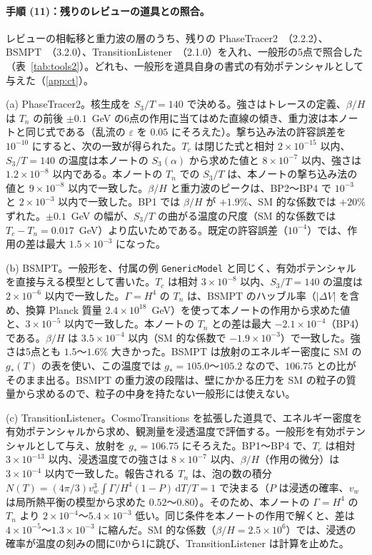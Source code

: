 \documentclass[a4paper,10pt]{ltjsarticle}
\newcommand{\dd}{\mathrm{d}}
\begin{document}
\paragraph{手順 (11)：残りのレビューの道具との照合。}レビューの相転移と重力波の層のうち、残りの PhaseTracer2~\cite{phasetracer2}（2.2.2）、BSMPT~\cite{bsmpt3}（3.2.0）、TransitionListener~\cite{tl2}（2.1.0）を入れ、一般形の5点で照合した（表~\ref{tab:tools2}）。どれも、一般形を道具自身の書式の有効ポテンシャルとして与えた（\ref{app:ct}）。

(a) PhaseTracer2。核生成を $S_3/T=140$ で決める。強さはトレースの定義、$\beta/H$ は $T_n$ の前後 $\pm0.1$~GeV の6点の作用に当てはめた直線の傾き、重力波は本ノートと同じ式である（乱流の $\varepsilon$ を $0.05$ にそろえた）。撃ち込み法の許容誤差を $10^{-10}$ にすると、次の一致が得られた。$T_c$ は閉じた式と相対 $2\times10^{-15}$ 以内、$S_3/T=140$ の温度は本ノートの $S_3(\alpha)$ から求めた値と $8\times10^{-7}$ 以内、強さは $1.2\times10^{-8}$ 以内である。本ノートの $T_n$ での $S_3/T$ は、本ノートの撃ち込み法の値と $9\times10^{-8}$ 以内で一致した。$\beta/H$ と重力波のピークは、BP2〜BP4 で $10^{-3}$ と $2\times10^{-3}$ 以内で一致した。BP1 では $\beta/H$ が $+1.9\%$、SM 的な係数では $+20\%$ ずれた。$\pm0.1$~GeV の幅が、$S_3/T$ の曲がる温度の尺度（SM 的な係数では $T_c-T_n=0.017$~GeV）より広いためである。既定の許容誤差（$10^{-4}$）では、作用の差は最大 $1.5\times10^{-3}$ になった。

(b) BSMPT。一般形を、付属の例 \texttt{GenericModel} と同じく、有効ポテンシャルを直接与える模型として書いた。$T_c$ は相対 $3\times10^{-8}$ 以内、$S_3/T=140$ の温度は $2\times10^{-6}$ 以内で一致した。$\Gamma=H^4$ の $T_n$ は、BSMPT のハッブル率（$|\Delta V|$ を含め、換算 Planck 質量 $2.4\times10^{18}$~GeV）を使って本ノートの作用から求めた値と、$3\times10^{-5}$ 以内で一致した。本ノートの $T_n$ との差は最大 $-2.1\times10^{-4}$（BP4）である。$\beta/H$ は $3.5\times10^{-4}$ 以内（SM 的な係数で $-1.9\times10^{-3}$）で一致した。強さは5点とも $1.5$〜$1.6\%$ 大きかった。BSMPT は放射のエネルギー密度に SM の $g_*(T)$ の表を使い、この温度では $g_*=105.0$〜$105.2$ なので、$106.75$ との比がそのまま出る。BSMPT の重力波の段階は、壁にかかる圧力を SM の粒子の質量から求めるので、粒子の中身を持たない一般形には使えない。

(c) TransitionListener。CosmoTransitions を拡張した道具で、エネルギー密度を有効ポテンシャルから求め、観測量を浸透温度で評価する。一般形を有効ポテンシャルとして与え、放射を $g_*=106.75$ にそろえた。BP1〜BP4 で、$T_c$ は相対 $3\times10^{-13}$ 以内、浸透温度での強さは $8\times10^{-7}$ 以内、$\beta/H$（作用の微分）は $3\times10^{-4}$ 以内で一致した。報告される $T_n$ は、泡の数の積分 $N(T)=(4\pi/3)v_w^3\int\Gamma/H^4(1-P)\,\dd T/T=1$ で決まる（$P$ は浸透の確率、$v_w$ は局所熱平衡の模型から求めた $0.52$〜$0.80$）。そのため、本ノートの $\Gamma=H^4$ の $T_n$ より $2\times10^{-4}$〜$5.4\times10^{-3}$ 低い。同じ条件を本ノートの作用で解くと、差は $4\times10^{-5}$〜$1.3\times10^{-3}$ に縮んだ。SM 的な係数（$\beta/H=2.5\times10^6$）では、浸透の確率が温度の刻みの間に0から1に跳び、TransitionListener は計算を止めた。
\end{document}
